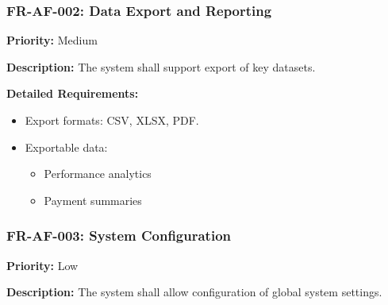 
\subsubsection{FR-AF-002: Data Export and Reporting}
\textbf{Priority:} Medium  

\textbf{Description:} The system shall support export of key datasets.

\textbf{Detailed Requirements:}
\begin{itemize}
    \item Export formats: CSV, XLSX, PDF.
    \item Exportable data:
    \begin{itemize}
        \item Performance analytics
        \item Payment summaries 
    \end{itemize}
\end{itemize}


\subsubsection{FR-AF-003: System Configuration}
\textbf{Priority:} Low  

\textbf{Description:} The system shall allow configuration of global system settings.

